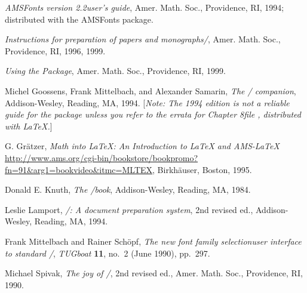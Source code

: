 \documentclass[11pt,leqno,titlepage,openany]{amsldoc}[1999/12/13]
\makeatletter
\let\old@url=\url
\def\url#1{\textcolor{blue}{\old@url{#1}}}
\newcommand{\booktitle}[1]{\textit{#1}}
\newcommand{\journalname}[1]{\textit{#1}}
\makeatother
\begin{document}
\begin{thebibliography}{9}

\booktitle{AMSFonts version \textup{2.2}\mdash user's guide},
Amer. Math. Soc., Providence, RI, 1994; distributed
with the AMSFonts package.

\booktitle{Instructions for preparation of
papers and monographs\mdash \amslatex/},
Amer. Math. Soc., Providence, RI, 1996, 1999.

\booktitle{Using the  Package},
Amer. Math. Soc., Providence, RI, 1999.

 Michel Goossens, Frank Mittelbach, and Alexander Samarin,
\booktitle{The \latex/ companion}, Addison-Wesley, Reading, MA, 1994.
  [\emph{Note: The 1994 edition is not a reliable guide for the
     package unless you refer to the errata for Chapter
    8\mdash file , distributed with \LaTeX{}.}]

\begin{raggedright}
 G. Gr\"{a}tzer,
\emph{Math into \LaTeX{}: An Introduction to \LaTeX{} and AMS-\LaTeX{}}
  \url{http://www.ams.org/cgi-bin/bookstore/bookpromo?fn=91&arg1=bookvideo&itmc=MLTEX},
Birkh\"{a}user, Boston, 1995.\par
\end{raggedright}

 Donald E. Knuth, \booktitle{The \tex/book},
Addison-Wesley, Reading, MA, 1984.

 Leslie Lamport, \booktitle{\latex/: A document preparation
system}, 2nd revised ed., Addison-Wesley, Reading, MA, 1994.

 Frank Mittelbach and Rainer Sch\"opf,
\textit{The new font family selection\mdash user
interface to standard \latex/}, \journalname{TUGboat} \textbf{11},
no.~2 (June 1990), pp.~297.

 Michael Spivak, \booktitle{The joy of \tex/}, 2nd revised ed.,
Amer. Math. Soc., Providence, RI, 1990.

\end{thebibliography}


\end{document}
